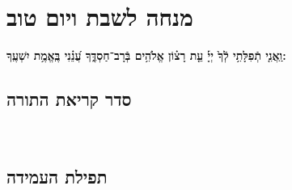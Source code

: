 \documentclass[twoside, openany, parskip=half, 11pt]{book}
\begin{document}
%
\blankpage
\chapter[מנחה לשבת ויו״ט]{ מנחה לשבת ויום טוב }
\tamid

\ketoret
\sepline
\ashrei

\uvaletzion

\halfkaddish


\textbf{וַֽאֲנִ֤י תְֿפִלָּתִ֥י לְֿךָ֙ יְיָ֡ עֵ֤ת רָצ֗וֹן אֱלֹהִ֥ים בְּֿרָב־חַסְדֶּ֑ךָ עֲ֝נֵ֗נִי בֶּֽאֱמֶ֥ת יִשְׁעֶֽךָ:} 


\section*{ סדר קריאת התורה }


\pesicha

\brikhshmei

\gadlu

\avharachamim

\vesigale


\torahbarachu

\hagomel

\nextpage
\hagbaha

\yehalelu

\\
\kafdalet

\nextpage
\etzchaim

\label{shabYTamidah}
\halfkaddish

\section*{ תפילת העמידה }


\amidaopening{\shabbosshuva}{}


\end{document}
